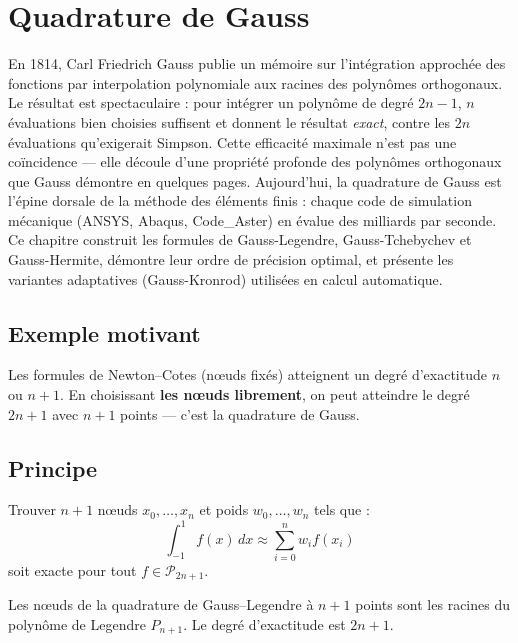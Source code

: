\chapter{Quadrature de Gauss}
\label{ch:gauss}

En 1814, Carl Friedrich Gauss publie un mémoire sur l'intégration approchée des fonctions par interpolation polynomiale aux racines des polynômes orthogonaux. Le résultat est spectaculaire : pour intégrer un polynôme de degré $2n-1$, $n$ évaluations bien choisies suffisent et donnent le résultat \emph{exact}, contre les $2n$ évaluations qu'exigerait Simpson. Cette efficacité maximale n'est pas une coïncidence --- elle découle d'une propriété profonde des polynômes orthogonaux que Gauss démontre en quelques pages. Aujourd'hui, la quadrature de Gauss est l'épine dorsale de la méthode des éléments finis : chaque code de simulation mécanique (ANSYS, Abaqus, Code\_Aster) en évalue des milliards par seconde. Ce chapitre construit les formules de Gauss-Legendre, Gauss-Tchebychev et Gauss-Hermite, démontre leur ordre de précision optimal, et présente les variantes adaptatives (Gauss-Kronrod) utilisées en calcul automatique.

\section{Exemple motivant}
Les formules de Newton--Cotes (n\oe uds fix\'es) atteignent un degr\'e d'exactitude $n$ ou $n+1$. En choisissant \textbf{les n\oe uds librement}, on peut atteindre le degr\'e $2n+1$ avec $n+1$ points --- c'est la quadrature de Gauss.

\section{Principe}

\begin{definition}
Trouver $n+1$ n\oe uds $x_0,\ldots,x_n$ et poids $w_0,\ldots,w_n$ tels que :
\[
\int_{-1}^1 f(x)\,dx \approx \sum_{i=0}^n w_i f(x_i)
\]
soit exacte pour tout $f\in\mathcal{P}_{2n+1}$.
\end{definition}

\begin{theoreme}
Les n\oe uds de la quadrature de Gauss--Legendre \`a $n+1$ points sont les racines du polyn\^ome de Legendre $P_{n+1}$. Le degr\'e d'exactitude est $2n+1$.
\end{theoreme}

